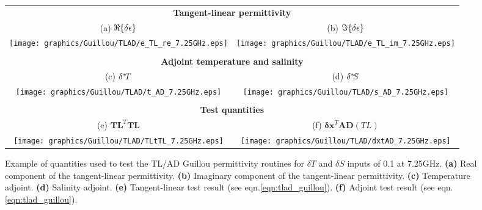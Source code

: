 \begin{figure}[htp]
  \centering
  \begin{tabular}{c c}
    \multicolumn{2}{c}{\sffamily\textbf{Tangent-linear permittivity}}\\
    \textsf{(a)} $\Re\{\delta\epsilon\}$ &
    \textsf{(b)} $\Im\{\delta\epsilon\}$ \\
    \texttt{[image: graphics/Guillou/TLAD/e\_TL\_re\_7.25GHz.eps]} &
    \texttt{[image: graphics/Guillou/TLAD/e\_TL\_im\_7.25GHz.eps]} \\\\
    \multicolumn{2}{c}{\sffamily\textbf{Adjoint temperature and salinity}}\\
    \textsf{(c)} $\delta^{*}\! {T}$ &
    \textsf{(d)} $\delta^{*}\! {S}$ \\
    \texttt{[image: graphics/Guillou/TLAD/t\_AD\_7.25GHz.eps]} &
    \texttt{[image: graphics/Guillou/TLAD/s\_AD\_7.25GHz.eps]} \\\\
    \multicolumn{2}{c}{\sffamily\textbf{Test quantities}}\\
    \textsf{(e)} $\mathbf{TL}^{T}\mathbf{TL}$ &
    \textsf{(f)} $\mathbf{\delta x}^{T}\mathbf{AD}(TL)$ \\
    \texttt{[image: graphics/Guillou/TLAD/TLtTL\_7.25GHz.eps]} & 
    \texttt{[image: graphics/Guillou/TLAD/dxtAD\_7.25GHz.eps]}
  \end{tabular}
  \caption{Example of quantities used to test the TL/AD Guillou permittivity routines for $\delta{T}$ and $\delta{S}$ inputs of 0.1 at 7.25GHz. \textbf{(a)} Real component of the tangent-linear permittivity.  \textbf{(b)} Imaginary component of the tangent-linear permittivity. \textbf{(c)} Temperature adjoint. \textbf{(d)} Salinity adjoint. \textbf{(e)} Tangent-linear test result (see eqn.\ref{eqn:tlad_guillou}). \textbf{(f)} Adjoint test result (see eqn.\ref{eqn:tlad_guillou}).}
  \label{fig:tlad_7.25GHz_guillou}
\end{figure}

